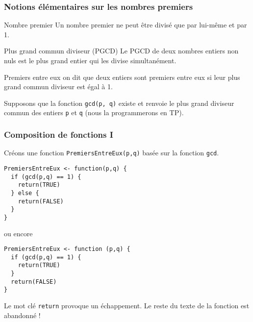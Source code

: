 \documentclass[10pt]{beamer}
\begin{document}

\begin{frame}
  \frametitle{Notions élémentaires sur les nombres premiers}
  \begin{block}{Nombre premier}
    Un nombre premier ne peut être divisé que par lui-même et par 1.
  \end{block}
  \begin{block}{Plus grand commun diviseur (PGCD)}
    Le PGCD de deux nombres entiers non nuls est le plus grand entier qui les divise simultanément. 
  \end{block}

  \begin{block}{Premiers entre eux}
    on dit que deux entiers sont premiers entre eux si leur plus grand commun diviseur est égal à 1.
  \end{block}

  Supposons que la fonction \texttt{gcd(p, q)} existe et renvoie le plus grand diviseur commun des entiers \texttt{p} et \texttt{q} (nous la programmerons en TP).
\end{frame}

\begin{frame}[fragile]
  \frametitle{Composition de fonctions I}
  Créons une fonction \texttt{PremiersEntreEux(p,q)} basée sur la fonction \texttt{gcd}.
  \begin{lstlisting}[style=editor]
PremiersEntreEux <- function(p,q) {
  if (gcd(p,q) == 1) {
    return(TRUE)
  } else {
    return(FALSE)
  }
}    
\end{lstlisting}
ou encore
\begin{lstlisting}[style=editor]
PremiersEntreEux <- function (p,q) {
  if (gcd(p,q) == 1) {
    return(TRUE)
  }
  return(FALSE)
}  
\end{lstlisting}
Le mot clé \alert{\texttt{return} provoque un échappement}. 
Le reste du texte de la fonction est abandonné !

\end{frame}
\end{document}
